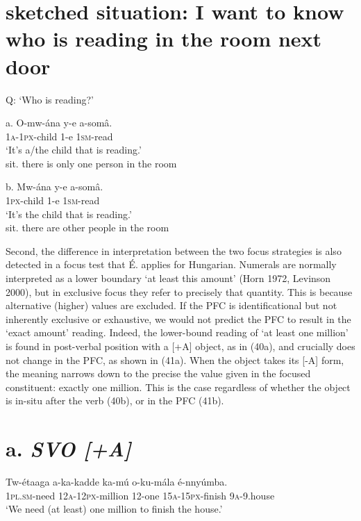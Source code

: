 \documentclass[output=paper]{langsci/langscibook}
\begin{document}
\chapter{sketched situation: I want to know who is reading in the room next door}
\glt   Q: ‘Who is reading?’
\z

\gll   a.  O-mw-ána  y-e  a-somâ.\\
         \textsc{1a}{}-\textsc{1px}{}-child  1-e  \textsc{1sm}{}-read\\
\glt     ‘It’s a/the child that is reading.’\\
sit. there is only one person in the room
\z

\gll   b.  Mw-ána  y-e  a-somâ.\\
         \textsc{1px}{}-child  1-e  \textsc{1sm}{}-read\\
\glt   ‘It’s the child that is reading.’\\
sit. there are other people in the room
\z

Second, the difference in interpretation between the two focus strategies is also detected in a focus test that É. \citet{Kiss2009} applies for Hungarian. Numerals are normally interpreted as a lower boundary ‘at least this amount’ (Horn 1972, Levinson 2000), but in exclusive focus they refer to precisely that quantity. This is because alternative (higher) values are excluded. If the PFC is identificational but not inherently exclusive or exhaustive, we would not predict the PFC to result in the ‘exact amount’ reading. Indeed, the lower-bound reading of ‘at least one million’ is found in post-verbal position with a [+A] object, as in (40a), and crucially does not change in the PFC, as shown in (41a). When the object takes its [-A] form, the meaning narrows down to the precise the value given in the focused constituent: exactly one million. This is the case regardless of whether the object is in-situ after the verb (40b), or in the PFC (41b).

\chapter[a.  SVO [+A{]}]{a.  \textit{SVO [+A]}}
\gll   Tw-étaaga  a-ka-kadde    ka-mú  o-ku-mála    é-nnyúmba.\\
       \textsc{1pl}.\textsc{sm}{}-need  \textsc{12a}{}-\textsc{12px}{}-million  12-one  \textsc{15a}{}-\textsc{15px}{}-finish  \textsc{9a}{}-9.house\\
\glt   ‘We need (at least) one million to finish the house.’
\z
\end{document}
